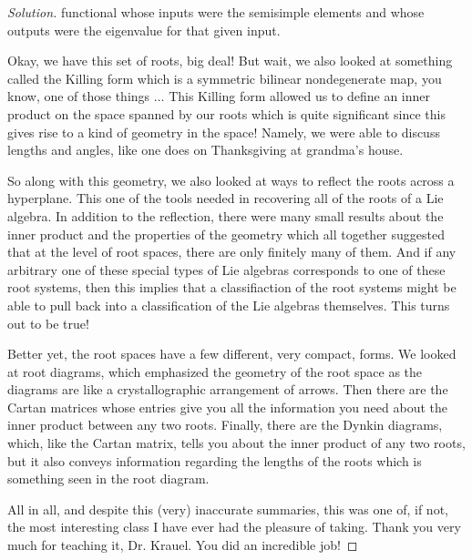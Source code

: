 \documentclass[12pt]{article}
\theoremstyle{definition}
\newenvironment{solution}
  {\renewcommand\qedsymbol{$\blacksquare$}\begin{proof}[Solution]}
  {\end{proof}}
\begin{document}
\begin{enumerate}
\begin{solution}
                functional whose inputs were the semisimple elements and whose
                outputs were the eigenvalue for that given
                input.\par\hspace{4mm} Okay, we have this set of roots, big
                deal! But wait, we also looked at something called the Killing
                form which is a symmetric bilinear nondegenerate map, you know,
                one of those things $\dots$ This Killing form allowed us to
                define an inner product on the space spanned by our roots which
                is quite significant since this gives rise to a kind of
                geometry in the space! Namely, we were able to discuss lengths
                and angles, like one does on Thanksgiving at grandma's
                house.\par\hspace{4mm} So along with this geometry, we also
                looked at ways to reflect the roots across a hyperplane. This
                one of the tools needed in recovering all of the roots of a Lie
                algebra. In addition to the reflection, there were many small
                results about the inner product and the properties of the
                geometry which all together suggested that at the level of root
                spaces, there are only finitely many of them. And if any
                arbitrary one of these special types of Lie algebras
                corresponds to one of these root systems, then this implies
                that a classifiaction of the root systems might be able to pull
                back into a classification of the Lie algebras themselves. This
                turns out to be true!\par\hspace{4mm} Better yet, the root
                spaces have a few different, very compact, forms. We looked at
                root diagrams, which emphasized the geometry of the root space
                as the diagrams are like a crystallographic arrangement of
                arrows. Then there are the Cartan matrices whose entries give
                you all the information you need about the inner product
                between any two roots. Finally, there are the Dynkin diagrams,
                which, like the Cartan matrix, tells you about the inner
                product of any two roots, but it also conveys information
                regarding the lengths of the roots which is something seen in
                the root diagram.\par\hspace{4mm} All in all, and despite this
                (very) inaccurate summaries, this was one of, if not, the most
                interesting class I have ever had the pleasure of taking.
                Thank you very much for teaching it, Dr. Krauel. You did an
                incredible job!
            \end{solution}
    \end{enumerate}
\end{document}
